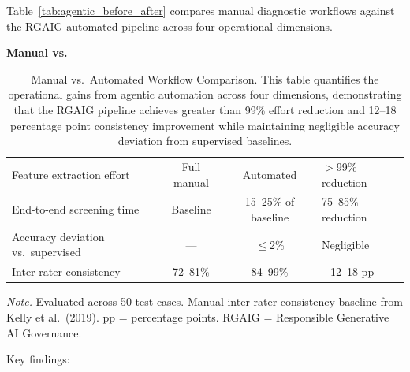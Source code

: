Table~\ref{tab:agentic_before_after} compares manual diagnostic workflows against the RGAIG automated pipeline across four operational dimensions.

\noindent\textbf{Manual vs.}

\begin{table}[H]
\tablestripes\tablefontsize
\caption[Manual vs.Automated Workflow Comparison]{Manual vs.\ Automated Workflow Comparison. This table quantifies the operational gains from agentic automation across four dimensions, demonstrating that the RGAIG pipeline achieves greater than 99\% effort reduction and 12--18 percentage point consistency improvement while maintaining negligible accuracy deviation from supervised baselines.}
\tablefontsize
\begin{tabularx}{\textwidth}{@{} p{3.5cm} C C L @{}}
\toprule
{} &  &  &  \\
\midrule
Feature extraction effort & Full manual & Automated & $>$99\% reduction \\
End-to-end screening time & Baseline & 15--25\% of baseline & 75--85\% reduction \\
Accuracy deviation vs.\ supervised & --- & $\leq$2\% & Negligible \\
Inter-rater consistency & 72--81\% & 84--99\% & +12--18 pp \\
\bottomrule
\end{tabularx}
\vspace{0.5em}\noindent\textit{Note.} Evaluated across 50 test cases. Manual inter-rater consistency baseline from Kelly et al.\ (2019). pp = percentage points. RGAIG = Responsible Generative AI Governance.
\end{table}

\noindent Key findings:

